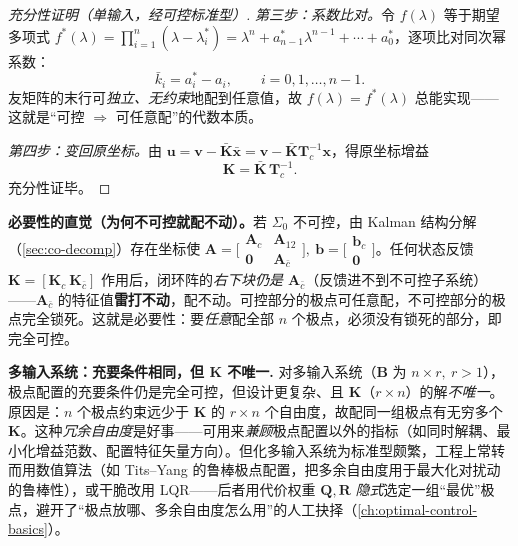 \begin{proof}[充分性证明（单输入，经可控标准型）]
\emph{第三步：系数比对。}\;令 $f(\lambda)$ 等于期望多项式 $f^*(\lambda)=\prod_{i=1}^n(\lambda-\lambda_i^*)=\lambda^n+a^*_{n-1}\lambda^{n-1}+\cdots+a^*_0$，逐项比对同次幂系数：
\begin{equation}
  \boxed{\bar k_i=a^*_i-a_i,\qquad i=0,1,\dots,n-1.}
  \label{eq:syn-kbar}
\end{equation}
友矩阵的末行可\emph{独立、无约束}地配到任意值，故 $f(\lambda)=f^*(\lambda)$ 总能实现——这就是“可控 $\Rightarrow$ 可任意配”的代数本质。

\emph{第四步：变回原坐标。}\;由 $\mathbf u=\mathbf v-\bar{\mathbf K}\bar{\mathbf x}=\mathbf v-\bar{\mathbf K}\mathbf T_c^{-1}\mathbf x$，得原坐标增益
\begin{equation}
  \mathbf K=\bar{\mathbf K}\,\mathbf T_c^{-1}.
  \label{eq:syn-K-orig}
\end{equation}
充分性证毕。
\end{proof}

\begin{insight}
\textbf{必要性的直觉（为何不可控就配不动）。}\;若 $\Sigma_0$ 不可控，由 Kalman 结构分解（\cref{sec:co-decomp}）存在坐标使 $\mathbf A=\big[\begin{smallmatrix}\mathbf A_c&\mathbf A_{12}\\\mathbf 0&\mathbf A_{\bar c}\end{smallmatrix}\big],\ \mathbf b=\big[\begin{smallmatrix}\mathbf b_c\\\mathbf 0\end{smallmatrix}\big]$。任何状态反馈 $\mathbf K=[\mathbf K_c\ \mathbf K_{\bar c}]$ 作用后，闭环阵的\emph{右下块仍是 $\mathbf A_{\bar c}$}（反馈进不到不可控子系统）——$\mathbf A_{\bar c}$ 的特征值\textbf{雷打不动}，配不动。可控部分的极点可任意配，不可控部分的极点完全锁死。这就是必要性：要\emph{任意}配全部 $n$ 个极点，必须没有锁死的部分，即完全可控。
\end{insight}

\begin{note}
\textbf{多输入系统：充要条件相同，但 $\mathbf K$ 不唯一.}\;
对多输入系统（$\mathbf B$ 为 $n\times r,\ r>1$），极点配置的充要条件仍是完全可控，但设计更复杂、且 $\mathbf K$（$r\times n$）的解\emph{不唯一}\cite{liubao2006modern,zhang2017modern}。原因是：$n$ 个极点约束远少于 $\mathbf K$ 的 $r\times n$ 个自由度，故配同一组极点有无穷多个 $\mathbf K$。这种\emph{冗余自由度}是好事——可用来\emph{兼顾}极点配置以外的指标（如同时解耦、最小化增益范数、配置特征矢量方向）。但化多输入系统为标准型颇繁，工程上常转而用数值算法（如 Tits--Yang 的鲁棒极点配置，把多余自由度用于最大化对扰动的鲁棒性），或干脆改用 LQR——后者用代价权重 $\mathbf Q,\mathbf R$ \emph{隐式}选定一组“最优”极点，避开了“极点放哪、多余自由度怎么用”的人工抉择（\cref{ch:optimal-control-basics}）。
\end{note}


